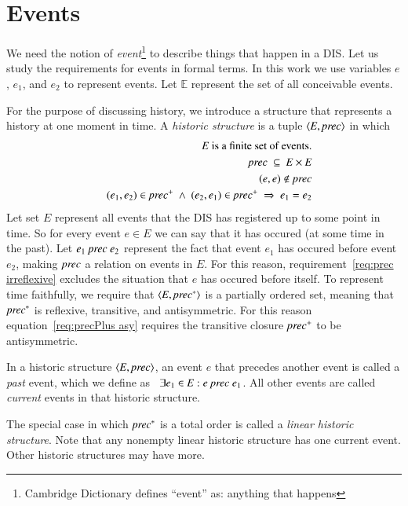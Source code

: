 \documentclass{elsarticle}
\def\id#1{\text{\em #1\/}}
\def\Events{{\mathit E}}
\begin{document}
\section{Events}
\label{sct:Events}
	We need the notion of {\em event}\footnote{Cambridge Dictionary defines ``event'' as: anything that happens} to describe things that happen in a DIS.
	Let us study the requirements for events in formal terms.
	In this work we use variables $e$, $e_1$, and $e_2$ to represent events.
	Let $\mathbb E$ represent the set of all conceivable events.

	For the purpose of discussing history, we introduce a structure that represents a history at one moment in time.
	A {\em historic structure} is a tuple $\la \Events, \id{prec}\ra$ in which
\begin{eqnarray}
	&&\Events\text{ is a finite set of events.}\\
	&&\id{prec}\ \subseteq\ \Events\times\Events\label{req:precInE}\\
	&&(e,e)\notin\id{prec}\label{req:prec irreflexive}\\
	&&(e_1,e_2)\in\id{prec}^+\ \wedge\ (e_2,e_1)\in\id{prec}^+\ \Rightarrow\ e_1=e_2\label{req:precPlus asy}
\end{eqnarray}
	Let set $\Events$ represent all events that the DIS has registered up to some point in time.
	So for every event $e\in\Events$ we can say that it has occured (at some time in the past).
	Let $e_1\ \id{prec}\ e_2$ represent the fact that event $e_1$ has occured before event $e_2$,
	making $\id{prec}$ a relation on events in $\Events$.
	For this reason, requirement~\ref{req:prec irreflexive} excludes the situation that $e$ has occured before itself.
	To represent time faithfully, we require that $\la\Events,\id{prec}^*\ra$ is a partially ordered set,
	meaning that $\id{prec}^*$ is reflexive, transitive, and antisymmetric.
	For this reason equation~\ref{req:precPlus asy} requires the transitive closure $\id{prec}^+$ to be antisymmetric.

	In a historic structure $\la \Events, \id{prec}\ra$, an event $e$ that precedes another event is called a {\em past} event,
	which we define as \ $\exists e_1\in\Events: e\ \id{prec}\ e_1$.
	All other events are called {\em current} events in that historic structure.

	The special case in which $\id{prec}^*$ is a total order is called a {\em linear historic structure}.
	Note that any nonempty linear historic structure has one current event.
	Other historic structures may have more.
\end{document}
